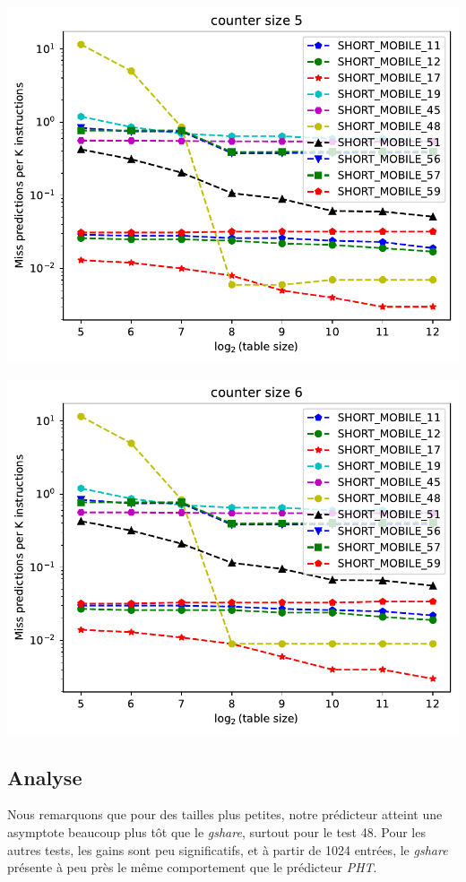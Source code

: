 \documentclass[a4paper]{article}
\begin{document}
\begin{minipage}{.48\linewidth}
\includegraphics[width=\linewidth]{pht/graph_5}
\end{minipage}%
\hfill
\begin{minipage}{.48\linewidth}
\includegraphics[width=\linewidth]{pht/graph_6}
\end{minipage}

\subsection{Analyse}

Nous remarquons que pour des tailles plus petites, notre prédicteur atteint une asymptote beaucoup plus tôt que le \textit{gshare}, surtout pour le test 48. Pour les autres tests, les gains sont peu significatifs, et à partir de 1024 entrées, le \textit{gshare} présente à peu près le même comportement que le prédicteur \textit{PHT}.
\end{document}
